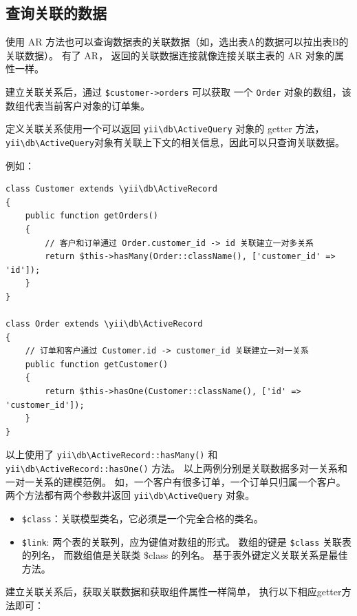 \subsection{查询关联的数据}
使用 AR 方法也可以查询数据表的关联数据（如，选出表A的数据可以拉出表B的关联数据）。
有了 AR，
返回的关联数据连接就像连接关联主表的 AR 对象的属性一样。

建立关联关系后，通过 \lstinline|$customer->orders| 可以获取
一个 \lstinline|Order| 对象的数组，该数组代表当前客户对象的订单集。

定义关联关系使用一个可以返回 \texttt{yii{\allowbreak{}\textbackslash}db{\allowbreak{}\textbackslash}ActiveQuery} 对象的 getter 方法，
\texttt{yii{\allowbreak{}\textbackslash}db{\allowbreak{}\textbackslash}ActiveQuery}对象有关联上下文的相关信息，因此可以只查询关联数据。

例如：

\lstset{language=php}\begin{lstlisting}
class Customer extends \yii\db\ActiveRecord
{
    public function getOrders()
    {
        // 客户和订单通过 Order.customer_id -> id 关联建立一对多关系
        return $this->hasMany(Order::className(), ['customer_id' => 'id']);
    }
}

class Order extends \yii\db\ActiveRecord
{
    // 订单和客户通过 Customer.id -> customer_id 关联建立一对一关系
    public function getCustomer()
    {
        return $this->hasOne(Customer::className(), ['id' => 'customer_id']);
    }
}
\end{lstlisting}
以上使用了 \texttt{yii{\allowbreak{}\textbackslash}db{\allowbreak{}\textbackslash}ActiveRecord\allowbreak{}::\allowbreak{}hasMany()} 和 \texttt{yii{\allowbreak{}\textbackslash}db{\allowbreak{}\textbackslash}ActiveRecord\allowbreak{}::\allowbreak{}hasOne()} 方法。
以上两例分别是关联数据多对一关系和一对一关系的建模范例。
如，一个客户有很多订单，一个订单只归属一个客户。
两个方法都有两个参数并返回 \texttt{yii{\allowbreak{}\textbackslash}db{\allowbreak{}\textbackslash}ActiveQuery} 对象。

\begin{itemize}
\item \lstinline|$class|：关联模型类名，它必须是一个完全合格的类名。
\item \lstinline|$link|: 两个表的关联列，应为键值对数组的形式。
数组的键是 \lstinline|$class| 关联表的列名，
而数组值是关联类 \$class 的列名。
基于表外键定义关联关系是最佳方法。
\end{itemize}
建立关联关系后，获取关联数据和获取组件属性一样简单，
执行以下相应getter方法即可：

